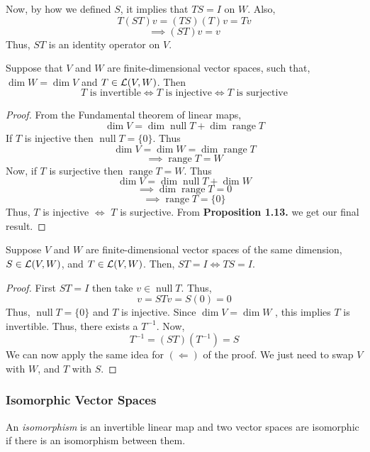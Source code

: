 Now, by how we defined $S$, it implies that $T S = I$ on $W$. Also,
\[ T(S T) v = (T S)(T) v = Tv  \]
\[ \implies (ST)v=v\]
Thus, $ST$ is an identity operator on $V$.

\begin{proposition}
    Suppose that $V$ and $W$ are finite-dimensional vector spaces, such that, $\dim W = \dim V$ and $T \in \operatorname{\mathcal{L}}(V,W)$. Then
    \[ T \text{ is invertible} \iff T \text{ is injective} \iff T \text{ is surjective} \]
\end{proposition}

\begin{proof}
From the Fundamental theorem of linear maps,
    \[ \dim V = \dim \operatorname{null} T + \dim \operatorname{range} T  \]
    If $T$ is injective then $\operatorname{null} T = \{0\}$. Thus
    \[ \dim V = \dim W = \dim \operatorname{range} T \]
    \[ \implies \operatorname{range} T = W \]
Now, if $T$ is surjective then $\operatorname{range} T = W$. Thus
\[ \dim V = \dim \operatorname{null} T  + \dim W\]
\[ \implies \dim \operatorname{range} T = 0 \]
\[ \implies \operatorname{range} T = \{0\} \]    
Thus, $T$ is injective $\iff$ $T$ is surjective. From \textbf{Proposition 1.13.} we get our final result.
\end{proof}


\begin{proposition}
    Suppose $V$ and $W$ are finite-dimensional vector spaces of the same dimension, $S \in \operatorname{\mathcal{L}}(V,W)$, and $T \in \operatorname{\mathcal{L}}(V,W)$. Then,
    $ST=I \iff TS=I$.
\end{proposition}

\begin{proof}
    First $ST=I$ then take $v \in \operatorname{null} T$. Thus,
    \[ v=STv = S(0)=0 \]
    Thus, $\operatorname{null} T = \{0\}$ and $T$ is injective. Since $\dim V = \dim W$ , this implies $T$ is invertible.
    Thus, there exists a $T^{-1}$. Now,
    \[ T^{-1}=(ST)(T^{-1}) =  S\] 
    We can now apply the same idea for $(\Leftarrow)$ of the proof. We just need to swap $V$ with $W$, and $T$ with $S$.
\end{proof}

\subsubsection{Isomorphic Vector Spaces}

\begin{definition}
    An \textit{isomorphism} is an invertible linear map and two vector spaces are isomorphic if there is an isomorphism between them.
\end{definition}

